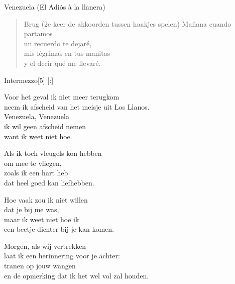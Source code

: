 \begin{song}[joropo]{Venezuela (El Adiós à la llanera)}
\begin{verse}{Brug (2e keer de akkoorden tussen haakjes spelen)}
Ma\~{n}ana cuando partamos\\
un recuerdo te dejar\'{e},\hspace{2em}\hspace{5em}\\
mis l\'{e}grimas en tus manitas\\
y el decir qu\'{e} me llevar\'{e}.
\end{verse}
\begin{instrumental}{Intermezzo}[5]
  \measure{}  \measure{}    [:] 
\end{instrumental}

\end{song}

\clearpage
\begin{translation}
Voor het geval ik niet meer terugkom\\
neem ik afscheid van het meisje uit Los Llanos.\\
Venezuela, Venezuela\\
ik wil geen afscheid nemen\\
want ik weet niet hoe.\vspace{\wlskip}

Als ik toch vleugels kon hebben\\
om mee te vliegen,\\
zoals ik een hart heb\\
dat heel goed kan liefhebben.\vspace{\wlskip}

Hoe vaak zou ik niet willen\\
dat je bij me was,\\
maar ik weet niet hoe ik\\
een beetje dichter bij je kan komen.\vspace{\wlskip}

Morgen, als wij vertrekken\\
laat ik een herinnering voor je achter:\\
tranen op jouw wangen\\
en de opmerking dat ik het wel vol zal houden. \\
\end{translation}

